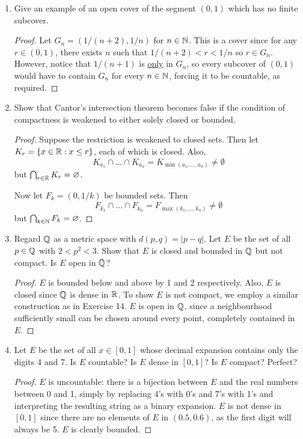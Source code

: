 \begin{enumerate}
\item %
Give an example of an open cover of the segment $(0, 1)$ which has no finite subcover.

\begin{proof}
Let $G_n = (1/(n+2), 1/n)$ for $n \in \mathbb{N}$. This is a cover since for any $r \in (0, 1)$, there exists $n$ such that $1/(n + 2) < r < 1/n$ so $r \in G_n$. However, notice that $1/(n + 1)$ is \underline{only} in $G_n$, so every subcover of $(0, 1)$ would have to contain $G_n$ for every $n \in \mathbb{N}$, forcing it to be countable, as required.
\end{proof}

\item %
Show that Cantor's intersection theorem becomes false if the condition of compactness is weakened to either solely closed or bounded.

\begin{proof}
Suppose the restriction is weakened to closed sets. Then let $K_r = \{x \in \mathbb{R} : x \le r\}$, each of which is closed. Also, 
\[
	K_{a_1} \cap \dotsc \cap K_{a_n} = K_{\min(a_1, \dotsc, a_n)} \ne \emptyset
\]
but $\bigcap_{r \in \mathbb{R}} K_r = \varnothing$.

Now let $F_k = (0, 1/k)$ be bounded sets. Then
\[
	F_{k_1} \cap \dotsc \cap F_{k_n} = F_{\max(k_1, \dotsc, k_n)} \ne \emptyset
\]
but $\bigcap_{k \in \mathbb{N}} F_k = \varnothing$.
\end{proof}

\item %
Regard $\mathbb{Q}$ as a metric space with $d(p, q) = |p - q|$. Let $E$ be the set of all $p \in \mathbb{Q}$ with $2 < p^2 < 3$. Show that $E$ is closed and bounded in $\mathbb{Q}$ but not compact. Is $E$ open in $\mathbb{Q}$?

\begin{proof}
$E$ is bounded below and above by 1 and 2 respectively. Also, $E$ is closed since $\mathbb{Q}$ is dense in $\mathbb{R}$. To show $E$ is not compact, we employ a similar construction as in Exercise 14. $E$ is open in $\mathbb{Q}$, since a neighbourhood sufficiently small can be chosen around every point, completely contained in $E$.
\end{proof}

\item %
Let $E$ be the set of all $x \in [0, 1]$ whose decimal expansion contains only the digits 4 and 7. Is $E$ countable? Is $E$ dense in $[0, 1]$? Is $E$ compact? Perfect?

\begin{proof}
$E$ is uncountable: there is a bijection between $E$ and the real numbers between 0 and 1, simply by replacing 4's with 0's and 7's with 1's and interpreting the resulting string as a binary expansion. $E$ is not dense in $[0, 1]$ since there are no elements of $E$ in $(0.5, 0.6)$, as the first digit will always be 5. $E$ is clearly bounded. 


\end{proof}
\end{enumerate}
